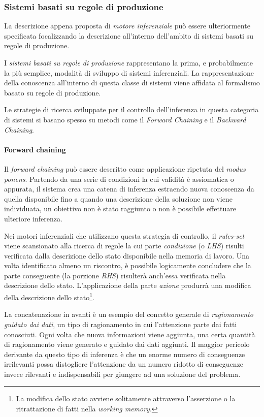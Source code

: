 \subsubsection{Sistemi basati su regole di produzione}

La descrizione appena proposta di \emph{motore inferenziale} può essere ulteriormente specificata focalizzando la descrizione all'interno dell'ambito di sistemi basati su regole di produzione.

I \emph{sistemi basati su regole di produzione} rappresentano la prima, e probabilmente la più semplice, modalità di sviluppo di sistemi inferenziali. La rappresentazione della conoscenza all'interno di questa classe di sistemi viene affidata al formalismo basato su regole di produzione.

Le strategie di ricerca sviluppate per il controllo dell'inferenza in questa categoria di sistemi si basano spesso su metodi come il \emph{Forward Chaining} e il \emph{Backward Chaining}.

\paragraph{Forward chaining}
Il \emph{forward chaining} può essere descritto come applicazione ripetuta del \emph{modus ponens}. Partendo da una serie di condizioni la cui validità è assiomatica o appurata, il sistema crea una catena di inferenza estraendo nuova conoscenza da quella disponibile fino a quando una descrizione della soluzione non viene individuata, un obiettivo non è stato raggiunto o non è possibile effettuare ulteriore inferenza.

Nei motori inferenziali che utilizzano questa strategia di controllo, il \emph{rules-set} viene scansionato alla ricerca di regole la cui parte \emph{condizione} (o \emph{LHS}) risulti verificata dalla descrizione dello stato disponibile nella memoria di lavoro. Una volta identificato almeno un riscontro, è possibile logicamente concludere che la parte conseguente (la porzione \emph{RHS}) risulterà anch'essa verificata nella descrizione dello stato. L'applicazione della parte \emph{azione} produrrà una modifica della descrizione dello stato\footnote{La modifica dello stato avviene solitamente attraverso l'asserzione o la ritrattazione di fatti nella \emph{working memory}.}.

La concatenazione in avanti è un esempio del concetto generale di \emph{ragionamento guidato dai dati}, un tipo di ragionamento in cui l'attenzione parte dai fatti conosciuti. Ogni volta che nuova informazioni viene aggiunta, una certa quantità di ragionamento viene generato e guidato dai dati aggiunti. Il maggior pericolo derivante da questo tipo di inferenza è che un enorme numero di conseguenze irrilevanti possa distogliere l'attenzione da un numero ridotto di conseguenze invece rilevanti e indispensabili per giungere ad una soluzione del problema. \cite{russellnorvig2009}


